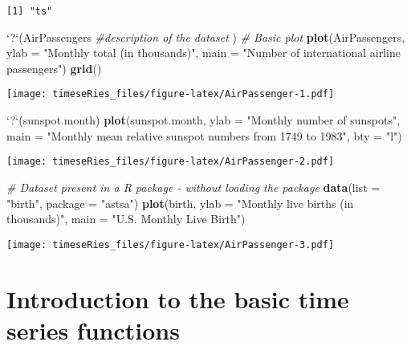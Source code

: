 \documentclass[]{book}
\newenvironment{Shaded}{\begin{snugshade}}{\end{snugshade}}
\newcommand{\KeywordTok}[1]{\textcolor[rgb]{0.13,0.29,0.53}{\textbf{#1}}}
\newcommand{\DataTypeTok}[1]{\textcolor[rgb]{0.13,0.29,0.53}{#1}}
\newcommand{\StringTok}[1]{\textcolor[rgb]{0.31,0.60,0.02}{#1}}
\newcommand{\CommentTok}[1]{\textcolor[rgb]{0.56,0.35,0.01}{\textit{#1}}}
\newcommand{\NormalTok}[1]{#1}
\begin{document}
\begin{verbatim}
[1] "ts"
\end{verbatim}

\begin{Shaded}
\begin{Highlighting}[]
\StringTok{`}\DataTypeTok{?}\StringTok{`}\NormalTok{(AirPassengers  }\CommentTok{#description of the dataset}
\NormalTok{)}
\CommentTok{# Basic plot}
\KeywordTok{plot}\NormalTok{(AirPassengers, }\DataTypeTok{ylab =} \StringTok{"Monthly total (in thousands)"}\NormalTok{, }\DataTypeTok{main =} \StringTok{"Number of international airline passengers"}\NormalTok{)}
\KeywordTok{grid}\NormalTok{()}
\end{Highlighting}
\end{Shaded}

\texttt{[image: timeseRies\_files/figure-latex/AirPassenger-1.pdf]}

\begin{Shaded}
\begin{Highlighting}[]
\StringTok{`}\DataTypeTok{?}\StringTok{`}\NormalTok{(sunspot.month)}
\KeywordTok{plot}\NormalTok{(sunspot.month, }\DataTypeTok{ylab =} \StringTok{"Monthly number of sunspots"}\NormalTok{, }\DataTypeTok{main =} \StringTok{"Monthly mean relative sunspot numbers from 1749 to 1983"}\NormalTok{, }
    \DataTypeTok{bty =} \StringTok{"l"}\NormalTok{)}
\end{Highlighting}
\end{Shaded}

\texttt{[image: timeseRies\_files/figure-latex/AirPassenger-2.pdf]}

\begin{Shaded}
\begin{Highlighting}[]
\CommentTok{# Dataset present in a R package - without loading the package}
\KeywordTok{data}\NormalTok{(}\DataTypeTok{list =} \StringTok{"birth"}\NormalTok{, }\DataTypeTok{package =} \StringTok{"astsa"}\NormalTok{)}
\KeywordTok{plot}\NormalTok{(birth, }\DataTypeTok{ylab =} \StringTok{"Monthly live births (in thousands)"}\NormalTok{, }\DataTypeTok{main =} \StringTok{"U.S. Monthly Live Birth"}\NormalTok{)}
\end{Highlighting}
\end{Shaded}

\texttt{[image: timeseRies\_files/figure-latex/AirPassenger-3.pdf]}

\section{Introduction to the basic time series
functions}\label{introduction-to-the-basic-time-series-functions}
\end{document}
